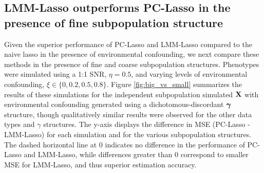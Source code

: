 \subsection{LMM-Lasso outperforms PC-Lasso in the presence of fine subpopulation structure}

Given the superior performance of PC-Lasso and LMM-Lasso compared to the naive lasso in the presence of environmental confounding, we next compare these methods in the presence of fine and coarse subpopulation structures. Phenotypes were simulated using a 1:1 SNR, $\eta = 0.5$, and varying levels of environmental confounding, $\xi \in \{0, 0.2, 0.5,0.8\}$. Figure \ref{fig:big_vs_small} summarizes the results of these simulations for the independent subpopulation simulated $\textbf{X}$ with environmental confounding generated using a dichotomous-discordant $\boldsymbol{\gamma}$ structure, though qualitatively similar results were observed for the other data types and $\gamma$ structures. The y-axis displays the difference in MSE (PC-Lasso - LMM-Lasso) for each simulation and for the various subpopulation structures. The dashed horizontal line at 0 indicates no difference in the performance of PC-Lasso and LMM-Lasso, while differences greater than 0 correspond to smaller MSE for LMM-Lasso, and thus superior estimation accuracy. 

